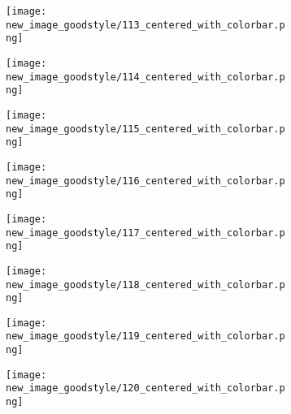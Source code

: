 \documentclass[a4paper,12pt]{article}
\begin{document}
\begin{figure}[H]
  \begin{subfigure}{0.11\textwidth}
    \texttt{[image: new\_image\_goodstyle/113\_centered\_with\_colorbar.png]}
  \end{subfigure}
  \hfill
  \begin{subfigure}{0.11\textwidth}
    \texttt{[image: new\_image\_goodstyle/114\_centered\_with\_colorbar.png]}
  \end{subfigure}
  \hfill
  \begin{subfigure}{0.11\textwidth}
    \texttt{[image: new\_image\_goodstyle/115\_centered\_with\_colorbar.png]}
  \end{subfigure}
  \hfill
  \begin{subfigure}{0.11\textwidth}
    \texttt{[image: new\_image\_goodstyle/116\_centered\_with\_colorbar.png]}
  \end{subfigure}
  \hfill
  \begin{subfigure}{0.11\textwidth}
    \texttt{[image: new\_image\_goodstyle/117\_centered\_with\_colorbar.png]}
  \end{subfigure}
  \hfill
  \begin{subfigure}{0.11\textwidth}
    \texttt{[image: new\_image\_goodstyle/118\_centered\_with\_colorbar.png]}
  \end{subfigure}
  \hfill
  \begin{subfigure}{0.11\textwidth}
    \texttt{[image: new\_image\_goodstyle/119\_centered\_with\_colorbar.png]}
  \end{subfigure}
  \hfill
  \begin{subfigure}{0.11\textwidth}
    \texttt{[image: new\_image\_goodstyle/120\_centered\_with\_colorbar.png]}
  \end{subfigure}
  \hfill
\end{figure}
\end{document}
